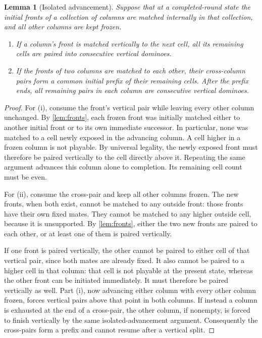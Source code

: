 \documentclass[11pt]{article}
\newtheorem{lemma}[theorem]{Lemma}
\theoremstyle{definition}
\theoremstyle{remark}
\begin{document}
\begin{lemma}[Isolated advancement]\label{lem:isolation}
Suppose that at a completed-round state the initial fronts of a collection
of columns are matched internally in that collection, and all other columns
are kept frozen.
\begin{enumerate}[label=(\roman*)]
\item If a column's front is matched vertically to the next cell, all its
remaining cells are paired into consecutive vertical dominoes.
\item If the fronts of two columns are matched to each other, their
cross-column pairs form a common initial prefix of their remaining cells.
After the prefix ends, all remaining pairs in each column are consecutive
vertical dominoes.
\end{enumerate}
\end{lemma}
\begin{proof}
For (i), consume the front's vertical pair while leaving every other
column unchanged. By \cref{lem:fronts}, each frozen front was initially matched either to
another initial front or to its own immediate successor. In particular,
none was matched to a cell newly exposed in the advancing column. A cell higher in a frozen column is not playable. By universal
legality, the newly exposed front must therefore be paired vertically to
the cell directly above it. Repeating the same argument advances this
column alone to completion. Its remaining cell count must be even.

For (ii), consume the cross-pair and keep all other columns frozen. The
new fronts, when both exist, cannot be matched to any outside front:
those fronts have their own fixed mates. They cannot be matched to any
higher outside cell, because it is unsupported. By
\cref{lem:fronts}, either the two new fronts are paired to each other,
or at least one of them is paired vertically.

If one front is paired vertically, the other cannot be paired to either
cell of that vertical pair, since both mates are already fixed. It also
cannot be paired to a higher cell in that column: that cell is not playable
at the present state, whereas the other front can be initiated immediately.
It must therefore be paired vertically as well. Part (i), now advancing
either column with every other column frozen, forces vertical pairs above
that point in both columns. If instead a column is exhausted at the end
of a cross-pair, the other column, if nonempty, is forced to finish
vertically by the same isolated-advancement argument. Consequently the
cross-pairs form a prefix and cannot resume after a vertical split.
\end{proof}
\end{document}
